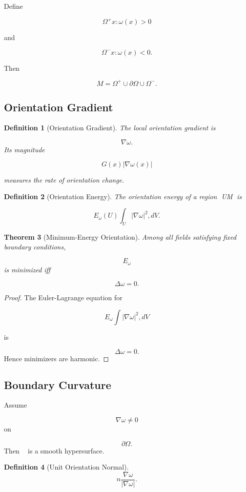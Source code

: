 \documentclass[12pt]{article}
\newtheorem{theorem}{Theorem}[section]
\newtheorem{definition}[theorem]{Definition}
\theoremstyle{remark}
\begin{document}
Define

\[
\Omega^{+}
{x:\omega(x)>0}
\]

and

\[
\Omega^{-}
{x:\omega(x)<0}.
\]

Then

\[
M=\Omega^{+}\cup\partial\Omega\cup\Omega^{-}.
\]
\subsection{Orientation Gradient}

\begin{definition}[Orientation Gradient]
The local orientation gradient is

\[
\nabla\omega.
\]
Its magnitude

\[
G(x)
|\nabla\omega(x)|
\]

measures the rate of orientation change.
\end{definition}

\begin{definition}[Orientation Energy]
The orientation energy of a region U\subseteq M is

\[
E_\omega(U)
\int_U
|\nabla\omega|^2,dV.
\]
\end{definition}

\begin{theorem}[Minimum-Energy Orientation]
Among all fields satisfying fixed boundary conditions,

\[
E_\omega
\]
is minimized iff

\[
\Delta\omega=0.
\]
\end{theorem}
\begin{proof}
The Euler-Lagrange equation for

\[
E_\omega
\int
|\nabla\omega|^2,dV
\]

is

\[
\Delta\omega=0.
\]
Hence minimizers are harmonic.
\end{proof}

\subsection{Boundary Curvature}

Assume

\[
\nabla\omega\neq0
\]
on

\[
\partial\Omega.
\]
Then \partial\Omega is a smooth hypersurface.

\begin{definition}[Unit Orientation Normal]
\[
n
\frac{\nabla\omega}
{|\nabla\omega|}.
\]
\end{definition}
\end{document}
